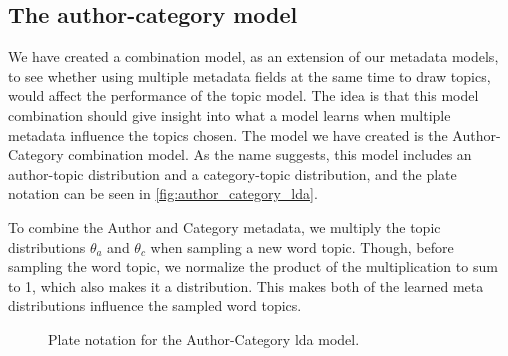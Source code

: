 \subsection{The author-category model}\label{sec:combination}
We have created a combination model, as an extension of our metadata models, to see whether using multiple metadata fields at the same time to draw topics, would affect the performance of the topic model.
The idea is that this model combination should give insight into what a model learns when multiple metadata influence the topics chosen.
The model we have created is the Author-Category combination model.
As the name suggests, this model includes an author-topic distribution and a category-topic distribution, and the plate notation can be seen in \autoref{fig:author_category_lda}.

To combine the Author and Category metadata, we multiply the topic distributions $\theta_a$ and $\theta_c$ when sampling a new word topic.
Though, before sampling the word topic, we normalize the product of the multiplication to sum to 1, which also makes it a distribution. 
This makes both of the learned meta distributions influence the sampled word topics.

\begin{figure*}[ht]
	\centering
	\resizebox{.3\textwidth}{!}{%
		
	}
	\caption{Plate notation for the Author-Category \gls{lda} model.}
	\label{fig:author_category_lda}
\end{figure*}



